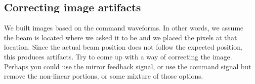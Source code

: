 \documentclass[a4paper]{report}
\begin{document}
\subsection{Correcting image artifacts}
We built images based on the command waveforms. 
In other words, we assume the beam is located where we asked it to be and we placed the pixels at that location.
Since the actual beam position does not follow the expected position, this produces artifacts. 
Try to come up with a way of correcting the image. 
Perhaps you could use the mirror feedback signal, or use the command signal but remove the non-linear portions, or some mixture of those options. 
\end{document}
